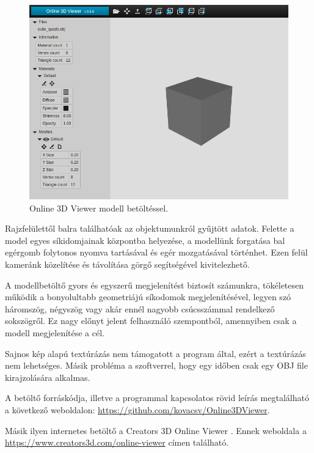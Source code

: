 \begin{figure}[h]
\centering
\includegraphics[width=\textwidth]{images/Model_Viewer_2.png}
\caption{Online 3D Viewer modell betöltéssel.}
\label{fig:model_viewer2}
\end{figure}

Rajzfelülettől balra találhatóak az objektumunkról gyűjtött adatok. Felette a model egyes síkidomjainak központba helyezése, a modellünk forgatása bal egérgomb folytonos nyomva tartásával és egér mozgatásával történhet. Ezen felül kameránk közelítése és távolítása görgő segítségével kivitelezhető.

A modellbetöltő gyors és egyszerű megjelenítést biztosít számunkra, tökéletesen működik a bonyolultabb geometriájú síkodomok megjelenítésével, legyen szó háromszög, négyszög vagy akár ennél nagyobb csúcsszámmal rendelkező sokszögről. Ez nagy előnyt jelent felhasználó szempontból, amennyiben csak a modell megjelenítése a cél.

Sajnos kép alapú textúrázás nem támogatott a program által, ezért a textúrázás nem lehetséges. Másik probléma a szoftverrel, hogy egy időben csak egy OBJ file kirajzolására alkalmas.

A betöltő forráskódja, illetve a programmal kapcsolatos rövid leírás megtalálható a következő weboldalon: \url{https://github.com/kovacsv/Online3DViewer}.


Másik ilyen internetes betöltő a Creators 3D Online Viewer \cite{creators2018creators3d}.
Ennek weboldala a  \url{https://www.creators3d.com/online-viewer} címen található.

